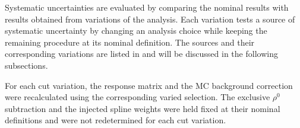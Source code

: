 


Systematic uncertainties are evaluated by comparing the nominal results with results obtained from variations of the analysis. Each variation tests a source of systematic uncertainty by changing an analysis choice while keeping the remaining procedure at its nominal definition. The sources and their corresponding variations are listed in  and will be discussed in the following subsections.

For each cut variation, the response matrix and the MC background correction were recalculated using the corresponding varied selection. The exclusive $\rho^{0}$ subtraction and the injected spline weights were held fixed at their nominal definitions and were not redetermined for each cut variation.

